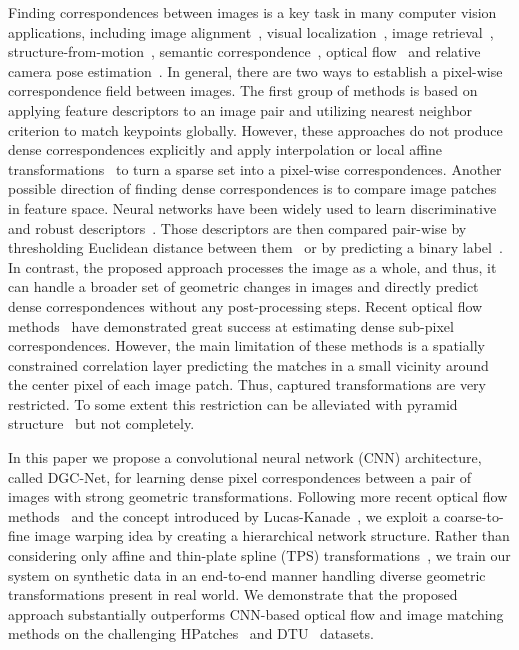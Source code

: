 \documentclass[10pt,twocolumn,letterpaper]{article}
\begin{document}
Finding correspondences between images is a key task in many computer vision applications, including image alignment~\cite{Rocco17,Rocco18}, visual localization~\cite{SemanticLocalization,inloc,Localization2}, image retrieval~\cite{NeuralCodes,Gordo}, structure-from-motion~\cite{colmap}, semantic correspondence~\cite{scnet,zak1}, optical flow~\cite{FlowNet2,Janai2018ECCV,Spynet,PWC-Net} and relative camera pose estimation~\cite{RelativePoseCNN,demon}. In general, there are two ways to establish a pixel-wise correspondence field between images. The first group of methods is based on applying feature descriptors to an image pair and utilizing nearest neighbor criterion to match keypoints globally. However, these approaches do not produce dense correspondences explicitly and apply interpolation or local affine transformations~\cite{bFunEccv14} to turn a sparse set into a pixel-wise correspondences. Another possible direction of finding dense correspondences is to compare image patches in feature space. Neural networks have been widely used to learn discriminative and robust descriptors~\cite{Balntas,DeepStereo}. Those descriptors are then compared pair-wise by thresholding Euclidean distance between them~\cite{UCN,Hierarchy2D3DMatching,patchM} or by predicting a binary label~\cite{ZagoruykoCVPR2015,Zbontar}. In contrast, the proposed approach processes the image as a whole, and thus, it can handle a broader set of geometric changes in images and directly predict dense correspondences without any post-processing steps. Recent optical flow methods~\cite{FlowNet2,PWC-Net} have demonstrated great success at estimating dense sub-pixel correspondences. However, the main limitation of these methods is a spatially constrained correlation layer predicting the matches in a small vicinity around the center pixel of each image patch. Thus, captured transformations are very restricted. To some extent this restriction can be alleviated with pyramid structure~\cite{PWC-Net} but not completely.

In this paper we propose a convolutional neural network (CNN) architecture, called DGC-Net, for learning dense pixel correspondences between a pair of images with strong geometric transformations. Following more recent optical flow methods~\cite{FlowNet2,Spynet,PWC-Net} and the concept introduced by Lucas-Kanade~\cite{lucas-kanade}, we exploit a coarse-to-fine image warping idea by creating a hierarchical network structure. Rather than considering only affine and thin-plate spline (TPS) transformations~\cite{Rocco17}, we train our system on synthetic data in an end-to-end manner handling diverse geometric transformations present in real world. We demonstrate that the proposed approach substantially outperforms CNN-based optical flow and image matching methods on the challenging HPatches~\cite{HPatches} and DTU~\cite{DTU} datasets. 
\end{document}
